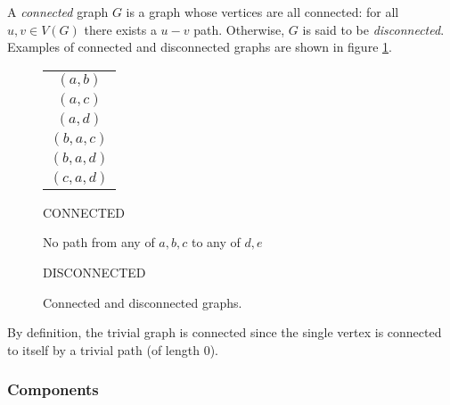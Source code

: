 A \emph{connected} graph \(G\) is a graph whose vertices are all connected: for all \(u,v\in V(G)\) there exists a
\(u-v\) path.  Otherwise, \(G\) is said to be \emph{disconnected}.  Examples of connected and disconnected graphs
are shown in figure \ref{fig:connect}.

\begin{figure}[H]
  \begin{minipage}[t]{2.75in}
    \centering

    \bigskip

    \begin{tabular}{c}
      \((a,b)\) \\
      \((a,c)\) \\
      \((a,d)\) \\
      \((b,a,c)\) \\
      \((b,a,d)\) \\
      \((c,a,d)\)
    \end{tabular}

    \bigskip
    
    CONNECTED
  \end{minipage}
  \begin{minipage}[t]{3in}
    \centering

    \bigskip
    
    No path from any of \(a,b,c\) to any of \(d,e\)

    \bigskip

    DISCONNECTED
  \end{minipage}
  \caption{Connected and disconnected graphs.}
  \label{fig:connect}
\end{figure}

By definition, the trivial graph is connected since the single vertex is connected to itself by a trivial path (of
length \(0\)).

\subsubsection{Components}\label{sec:sub:sub:components}

